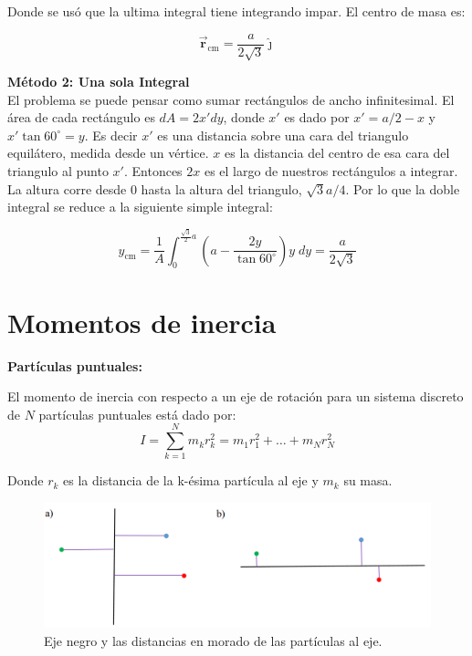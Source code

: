 \documentclass[a4paper,11pt]{article}
\begin{document}
Donde se usó que la ultima integral tiene integrando impar. El centro de masa es:

\begin{equation}
\vec{\boldsymbol{r}}_{\text{cm}} =  \frac{a}{2 \sqrt{3}} \hat{\boldsymbol{\jmath}}
\end{equation}

\textbf{Método 2: Una sola Integral}\\


El problema se puede pensar como sumar rectángulos de ancho infinitesimal. El área de cada rectángulo es $dA = 2x' dy$, donde $x'$ es dado por $x'= a/2 - x$ y $x' \tan 60^{\circ} = y$. Es decir $x'$ es una distancia sobre una cara del triangulo equilátero, medida desde un vértice. $x$ es la distancia del centro de esa cara del triangulo al punto $x'$. Entonces $2x$ es el largo de nuestros rectángulos a integrar. La altura corre desde $0$ hasta la altura del triangulo, $\sqrt{3}a/4$. Por lo que la doble integral se reduce a la siguiente simple integral:  


\begin{equation*}
 y_{\text{cm}} = \frac{1}{A} \int_{0}^{\frac{\sqrt{3}}{2}a}  \left( a - \frac{2 y}{\tan 60^{\circ}} \right) y \; dy = \frac{a}{2\sqrt{3}}
\end{equation*}

\pagebreak
\section{Momentos de inercia}

\textbf{Partículas puntuales:}

El momento de inercia con respecto a un eje de rotación para un sistema discreto de $N$ partículas puntuales  está dado por:
\begin{equation}
I = \sum_{k=1}^{N} m_k r_k^2 = m_1 r_1^2 + \dots + m_N r_N^2
\end{equation}

Donde $ r_k$ es la distancia de la k-ésima partícula al eje y $m_k$ su masa. 


\begin{figure}[H]
	\centering
	\includegraphics[width=\linewidth]{./im/rot1}
		\caption{Eje negro y las distancias en morado de las partículas al eje.}
\end{figure}
\end{document}
